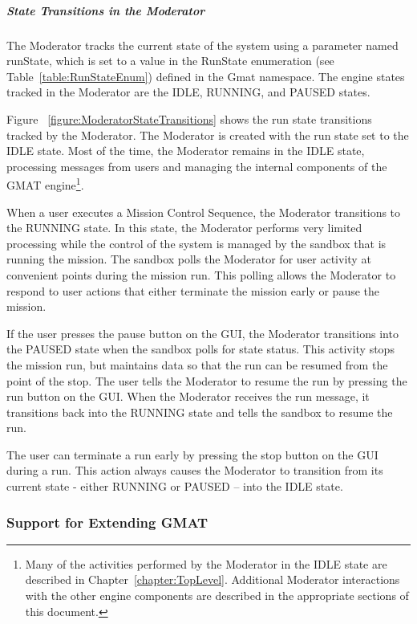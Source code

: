 \subparagraph{\label{section:ModeratorStates}\textit{State Transitions in the Moderator}}

The Moderator tracks the current state of the system using a parameter named runState, which is set
to a value in the RunState enumeration (see Table~\ref{table:RunStateEnum}) defined in the Gmat
namespace.  The engine states tracked in the Moderator are the IDLE, RUNNING, and PAUSED states.

Figure ~\ref{figure:ModeratorStateTransitions} shows the run state transitions tracked by the
Moderator.  The Moderator is created with the run state set to the IDLE state.  Most of the time,
the Moderator remains in the IDLE state, processing messages from users and managing the internal
components of the GMAT engine\footnote{Many of the activities performed by the Moderator in the IDLE
state are described in Chapter~\ref{chapter:TopLevel}.  Additional Moderator interactions with the
other engine components are described in the appropriate sections of this document.}.

When a user executes a Mission Control Sequence, the Moderator transitions to the RUNNING state.  In
this state, the Moderator performs very limited processing while the control of the system is
managed by the sandbox that is running the mission.  The sandbox polls the Moderator for user
activity at convenient points during the mission run.  This polling allows the Moderator to respond
to user actions that either terminate the mission early or pause the mission.

If the user presses the pause button on the GUI, the Moderator transitions into the PAUSED state
when the sandbox polls for state status.  This activity stops the mission run, but maintains data so
that the run can be resumed from the point of the stop.  The user tells the Moderator to resume the
run by pressing the run button on the GUI.  When the Moderator receives the run message, it
transitions back into the RUNNING state and tells the sandbox to resume the run.

The user can terminate a run early by pressing the stop button on the GUI during a run.  This action
always causes the Moderator to transition from its current state - either RUNNING or PAUSED -- into
the IDLE state.

\subsubsection{Support for Extending GMAT}

